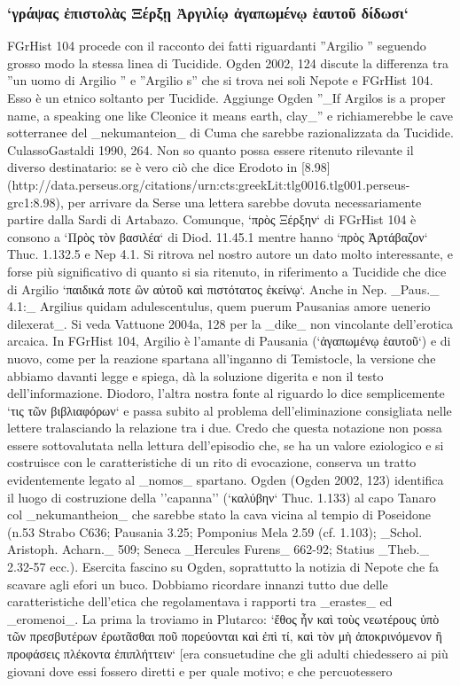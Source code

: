             \subsubsection{`γράψας ἐπιστολὰς Ξέρξῃ Ἀργιλίῳ ἀγαπωμένῳ ἑαυτοῦ δίδωσι`}
            FGrHist 104 procede con il racconto dei fatti riguardanti ''Argilio '' seguendo grosso modo la stessa linea di Tucidide. Ogden 2002, 124 discute la differenza tra ''un uomo di Argilio '' e ''Argilio s'' che si trova nei soli  Nepote e FGrHist 104. Esso è un etnico soltanto per Tucidide. Aggiunge Ogden ''_If Argilos is a proper name, a speaking one like Cleonice it means earth, clay_'' e richiamerebbe le cave sotterranee del _nekumanteion_ di Cuma 
            che sarebbe razionalizzata da Tucidide. CulassoGastaldi 1990, 264. Non so quanto possa essere ritenuto rilevante il diverso destinatario: se è vero ciò che dice Erodoto in [8.98](http://data.perseus.org/citations/urn:cts:greekLit:tlg0016.tlg001.perseus-grc1:8.98), per arrivare da Serse una lettera sarebbe dovuta necessariamente partire dalla Sardi di Artabazo. Comunque, `πρὸς Ξέρξην` di FGrHist 104 è consono a `Πρὸς τὸν βασιλέα` di Diod. 11.45.1 mentre hanno `πρὸς Ἀρτάβαζον` Thuc. 1.132.5 e Nep 4.1. Si ritrova nel nostro autore un dato molto interessante, e forse più significativo di quanto si sia ritenuto, in riferimento a Tucidide che dice di Argilio  `παιδικά ποτε ὢν αὐτοῦ καὶ πιστότατος ἐκείνῳ`. Anche in Nep. _Paus._ 4.1:_ Argilius quidam adulescentulus, quem puerum Pausanias amore uenerio dilexerat_. Si veda Vattuone 2004a, 128 per la _dike_ non vincolante dell'erotica arcaica.  In FGrHist 104, Argilio  è l'amante di Pausania  (`ἀγαπωμένῳ ἑαυτοῦ`) e di nuovo, come per la reazione spartana all'inganno di Temistocle, la versione che abbiamo davanti legge e spiega, dà la soluzione digerita e non il testo dell'informazione. Diodoro, l'altra nostra fonte al riguardo lo dice semplicemente `τις τῶν βιβλιαφόρων` e passa subito al problema dell'eliminazione consigliata nelle lettere tralasciando la relazione tra i due. Credo che questa notazione non possa essere sottovalutata nella lettura dell'episodio che, se ha un valore eziologico e si costruisce con le caratteristiche di un rito di evocazione, conserva un tratto evidentemente legato al _nomos_ spartano. Ogden (Ogden 2002, 123) identifica il luogo di costruzione della ''capanna'' (`καλύβην` Thuc. 1.133) al capo Tanaro col _nekumantheion_ che sarebbe stato la cava vicina al tempio di Poseidone (n.53 Strabo C636; Pausania 3.25; Pomponius Mela 2.59 (cf. 1.103); _Schol. Aristoph. Acharn._ 509; Seneca _Hercules Furens_ 662-92; Statius _Theb._ 2.32-57 ecc.). Esercita fascino su Ogden, soprattutto la notizia di  Nepote che fa scavare agli efori un buco. Dobbiamo ricordare innanzi tutto due delle caratteristiche dell'etica che regolamentava i rapporti tra _erastes_ ed _eromenoi_. La prima la troviamo in Plutarco: `ἔθος ἦν καὶ τοὺς νεωτέρους ὑπὸ τῶν πρεσβυτέρων ἐρωτᾶσθαι ποῦ πορεύονται καὶ ἐπὶ τί, καὶ τὸν μὴ ἀποκρινόμενον ἢ προφάσεις πλέκοντα ἐπιπλήττειν` [era consuetudine che gli adulti chiedessero ai più giovani dove essi fossero diretti e per quale motivo; e che percuotessero 
